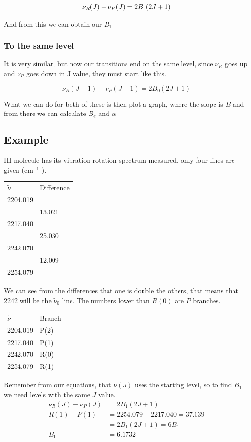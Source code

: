 \documentclass{article}
\newcommand{\cm}{cm\(^{-1}\) }
\begin{document}
    $$\nu_R(J) - \nu_P(J) = 2B_1(2J+1)\\$$

    And from this we can obtain our $B_1$

    \subsubsection{To the same level}
    It is very similar, but now our transitions end on the same level, since $\nu_R$ goes up and $\nu_P$ goes down 
    in J value, they must start like this.

    $$\nu_R(J-1) - \nu_P(J+1) = 2B_0(2J+1)$$

    What we can do for both of these is then plot a graph, where the slope is $B$ and from there we can calculate $B_e$ and $\alpha$

    \subsection{Example}
    HI molecule has its vibration-rotation spectrum measured, only four lines are given (\cm).

    \begin{tabular}{l l}
        $\tilde{\nu}$ & Difference\\
        2204.019\\
        & 13.021\\
        2217.040\\
        & 25.030\\
        2242.070\\
        &12.009 \\
        2254.079\\
    \end{tabular}

    We can see from the differences that one is double the others, that means that 2242 will be the $\tilde{\nu}_0$ line.
    The numbers lower than $R(0)$ are $P$ branches. 

    \begin{tabular}{l l}
        $\tilde{\nu}$ & Branch\\
        2204.019 & P(2)\\
        2217.040 & P(1)\\
        2242.070 & R(0)\\
        2254.079 & R(1)\\
    \end{tabular}

    Remember from our equations, that $\nu(J)$ uses the starting level, so to find $B_1$ we need levels with the 
    same $J$ value.
    \begin{align*}
        \nu_R(J) - \nu_P(J) &= 2B_1(2J+1)\\
        R(1) - P(1) &= 2254.079 - 2217.040 = 37.039\\
        &= 2B_1(2J+1) = 6B_1\\
        B_1 &= 6.1732
    \end{align*}
\end{document}
